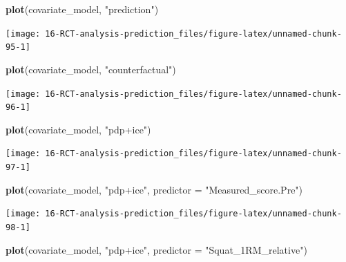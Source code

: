 \documentclass[
]{book}
\newenvironment{Shaded}{\begin{snugshade}}{\end{snugshade}}
\newcommand{\DataTypeTok}[1]{\textcolor[rgb]{0.13,0.29,0.53}{#1}}
\newcommand{\KeywordTok}[1]{\textcolor[rgb]{0.13,0.29,0.53}{\textbf{#1}}}
\newcommand{\NormalTok}[1]{#1}
\newcommand{\StringTok}[1]{\textcolor[rgb]{0.31,0.60,0.02}{#1}}
\begin{document}
\begin{Shaded}
\begin{Highlighting}[]
\KeywordTok{plot}\NormalTok{(covariate\_model, }\StringTok{"prediction"}\NormalTok{)}
\end{Highlighting}
\end{Shaded}

\begin{center}\texttt{[image: 16-RCT-analysis-prediction\_files/figure-latex/unnamed-chunk-95-1]} \end{center}

\begin{Shaded}
\begin{Highlighting}[]
\KeywordTok{plot}\NormalTok{(covariate\_model, }\StringTok{"counterfactual"}\NormalTok{)}
\end{Highlighting}
\end{Shaded}

\begin{center}\texttt{[image: 16-RCT-analysis-prediction\_files/figure-latex/unnamed-chunk-96-1]} \end{center}

\begin{Shaded}
\begin{Highlighting}[]
\KeywordTok{plot}\NormalTok{(covariate\_model, }\StringTok{"pdp+ice"}\NormalTok{)}
\end{Highlighting}
\end{Shaded}

\begin{center}\texttt{[image: 16-RCT-analysis-prediction\_files/figure-latex/unnamed-chunk-97-1]} \end{center}

\begin{Shaded}
\begin{Highlighting}[]
\KeywordTok{plot}\NormalTok{(covariate\_model, }\StringTok{"pdp+ice"}\NormalTok{, }\DataTypeTok{predictor =} \StringTok{"Measured\_score.Pre"}\NormalTok{)}
\end{Highlighting}
\end{Shaded}

\begin{center}\texttt{[image: 16-RCT-analysis-prediction\_files/figure-latex/unnamed-chunk-98-1]} \end{center}

\begin{Shaded}
\begin{Highlighting}[]
\KeywordTok{plot}\NormalTok{(covariate\_model, }\StringTok{"pdp+ice"}\NormalTok{, }\DataTypeTok{predictor =} \StringTok{"Squat\_1RM\_relative"}\NormalTok{)}
\end{Highlighting}
\end{Shaded}
\end{document}
